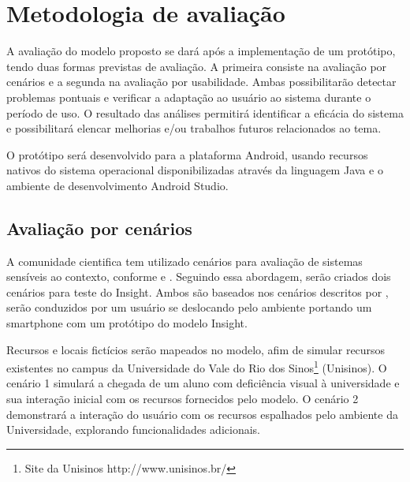 \documentclass[english,brazilian]{UNISINOSmonografia}
\begin{document}
	\section{Metodologia de avaliação}
A avaliação do modelo proposto se dará após a implementação de um protótipo, tendo duas formas previstas de avaliação. A primeira consiste na avaliação por cenários e a segunda na avaliação por usabilidade. Ambas possibilitarão detectar problemas pontuais e verificar a adaptação ao usuário ao sistema durante o período de uso. O resultado das análises permitirá identificar a eficácia do sistema e possibilitará elencar melhorias e/ou trabalhos futuros relacionados ao tema.

O protótipo será desenvolvido para a plataforma Android, usando recursos nativos do sistema operacional disponibilizadas através da linguagem Java e o ambiente de desenvolvimento Android Studio.

\subsection{Avaliação por cenários}
A comunidade cientifica tem utilizado cenários para avaliação de sistemas sensíveis ao contexto, conforme  e . Seguindo essa abordagem, serão criados dois cenários para teste do Insight. Ambos são baseados nos cenários descritos por , serão conduzidos por um usuário se deslocando pelo ambiente portando um smartphone com um protótipo do modelo Insight. 

Recursos e locais fictícios serão mapeados no modelo, afim de simular recursos existentes no campus da Universidade do Vale do Rio dos Sinos\footnote{Site da Unisinos http://www.unisinos.br/} (Unisinos).
O cenário 1 simulará a chegada de um aluno com deficiência visual à universidade e sua interação inicial com os recursos fornecidos pelo modelo. O cenário 2 demonstrará a interação do usuário com os recursos espalhados pelo ambiente da Universidade, explorando funcionalidades adicionais.
\end{document}
